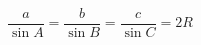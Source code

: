 \documentclass[12pt]{article}
\begin{document}
\[
    \frac{a}{\sin{A}} =
    \frac{b}{\sin{B}} =
    \frac{c}{\sin{C}} = 2R
\]
\end{document}
